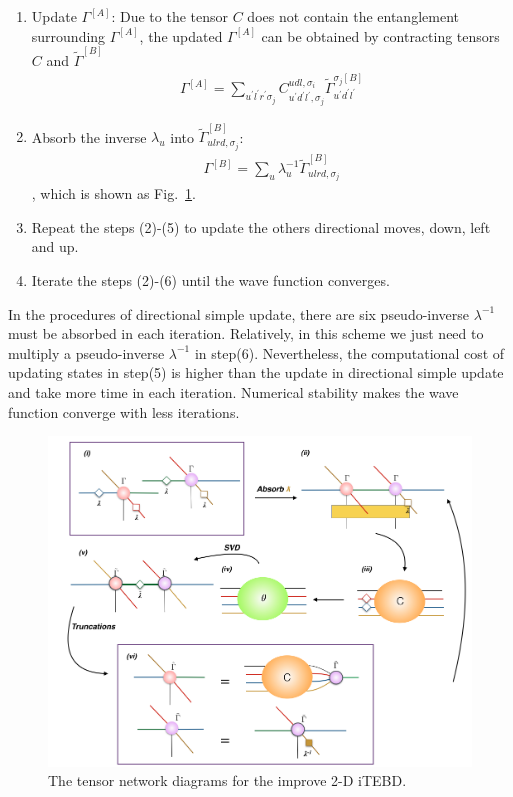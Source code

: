 \begin{enumerate}
		\item Update $\Gamma^{[A]}$: Due to the tensor $C$ does not contain the entanglement surrounding $\Gamma^{[A]}$, the updated $\Gamma^{[A]}$ can be obtained by contracting tensors $C$ and $\widetilde{\Gamma}^{[B]}$
			\begin{align}
				\Gamma^{[A]} = \sum_{u^{\prime}l^{\prime}r^{\prime}\sigma_j}{C^{udl,\sigma_i}_{u^{\prime}d^{\prime}l^{\prime},\sigma_j} \widetilde{\Gamma}^{\sigma_j [B]}_{u^{\prime}d^{\prime}l^{\prime}}}
			\end{align}
		\item Absorb the inverse $\lambda_{u}$ into $\widetilde{\Gamma}^{[B]}_{ulrd,\sigma_j}$:
			\begin{align}
				\Gamma^{[B]} = \sum_{u}{\lambda_{u}^{-1}\widetilde{\Gamma}^{[B]}_{ulrd,\sigma_j}}
			\end{align}
			, which is shown as Fig.~\ref{fig318}.
		\item Repeat the steps (2)-(5) to update the others directional moves, down, left and up.  
		\item Iterate the steps (2)-(6) until the wave function converges.
\end{enumerate}

In the procedures of directional simple update, there are six pseudo-inverse $\lambda^{-1}$ must be absorbed in each iteration. Relatively, in this scheme we just need to multiply a pseudo-inverse $\lambda^{-1}$ in step(6). Nevertheless, the computational cost of updating states in step(5) is higher than the update in directional simple update and take more time in each iteration. Numerical stability makes the wave function converge with less iterations.

\begin{figure}[ht]
	\centering
	\includegraphics[width=1.00\textwidth]{figures/fig317.png}
	\caption[The tensor network diagrams for the 2-D iTEBD with QR decomposition]{The tensor network diagrams for the improve 2-D iTEBD.}
	\label{fig318}
\end{figure}


